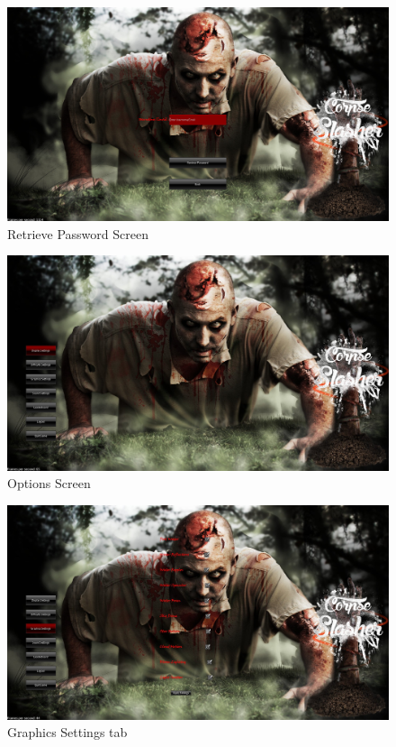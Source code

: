 \documentclass[letterpaper]{article}
\begin{document}
			
		\begin{figure}[H]
		\centering
		\includegraphics[width=130mm]{GUI_ScreenShots/RetrievePassword.jpg}
		\caption{Retrieve Password Screen}
		\end{figure}
		
			
		\begin{figure}[H]
		\centering
		\includegraphics[width=130mm]{GUI_ScreenShots/OptionsScreen.jpg}
		\caption{Options Screen}
		\end{figure}
		
			
		\begin{figure}[H]
		\centering
		\includegraphics[width=130mm]{GUI_ScreenShots/GraphicsSettings.jpg}
		\caption{Graphics Settings tab}
		\end{figure}
		
\end{document}
